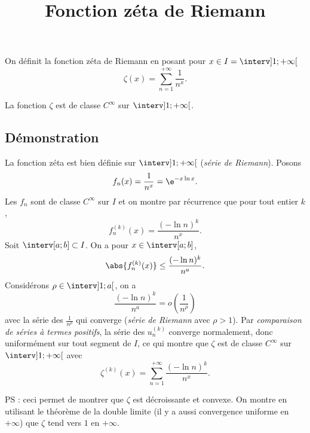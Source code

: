 \documentclass[fontsize=12pt,twoside=false,parskip=half]{scrartcl}
\title{Fonction zéta de Riemann}
\date{}
\author{}
\begin{document}
\maketitle
    On définit la fonction zéta de Riemann en posant pour $x \in I = \interv]1; +\infty[$
    \[
      \zeta(x) = \sum_{n = 1}^{+\infty} \frac{1}{n^x}.
    \]
   \begin{Theoreme}
      La fonction $\zeta$ est de classe $C^\infty$ sur $\interv]1; +\infty[$.
   \end{Theoreme}
   \subsection{Démonstration}
      La fonction zéta est bien définie sur $\interv]1; +\infty[$ (\emph{série de Riemann}). Posons
      \[
         f_n(x) = \frac{1}{n^x} = \e^{-x \ln x}.
      \]
      Les $f_n$ sont de classe $C^\infty$ sur $I$ et on montre par récurrence que pour tout entier $k$, 
      \[
         f_n^{(k)}(x) = \frac{(- \ln n)^k}{n^x}.
      \]
      Soit $\interv[a; b] \subset I$. On a pour $x \in \interv[a; b]$,
      \[
         \abs{f_n^{(k)}(x)} \leq \frac{(- \ln n)^k}{n^a}.
      \]
      Considérons $\rho \in \interv]1; a[$, on a
      \[
         \frac{(- \ln n)^k}{n^a}  = o\left(\frac{1}{n^\rho}\right)
      \]
      avec la série des $\frac{1}{n^\rho}$ qui converge (\emph{série de Riemann} avec $\rho > 1$). Par 
      \emph{comparaison de séries à termes positifs}, la série des $u_n^{(k)}$ converge normalement, donc uniformément
      sur tout segment de $I$, ce qui montre que $\zeta$ est de classe $C^\infty$ sur $\interv]1; +\infty[$ avec 
      \[
         \zeta^{(k)}(x) = \sum_{n = 1}^{+\infty} \frac{(- \ln n)^k}{n^x}.
      \]
      
      PS : ceci permet de montrer que $\zeta$ est décroissante et convexe. On montre en utilisant le théorème de la double
      limite (il y a aussi convergence uniforme en $+\infty$) que $\zeta$ tend vers $1$ en $+\infty$.
\end{document}
